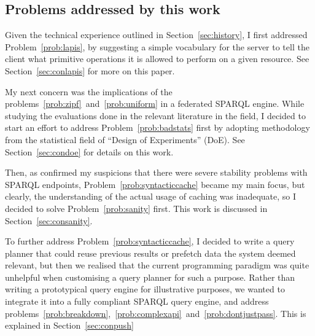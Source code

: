 \subsection{Problems addressed by this work}\label{sec:probaddress}

Given the technical experience outlined in Section~\ref{sec:history},
I first addressed Problem~\ref{prob:lapis}, by suggesting a simple
vocabulary for the server to tell the client what primitive operations
it is allowed to perform on a given resource. See
Section~\ref{sec:conlapis} for more on this paper.

My next concern was the implications of the
problems~\ref{prob:zipf}~and~\ref{prob:uniform} in a federated SPARQL
engine. While studying the evaluations done in the relevant literature
in the field, I decided to start an effort to address
Problem~\ref{prob:badstats} first by adopting methodology from the
statistical field of ``Design of Experiments'' (DoE). See
Section~\ref{sec:condoe} for details on this work.

Then, as \cite{buil2013sparql} confirmed my suspicions that there were
severe stability problems with SPARQL endpoints,
Problem~\ref{prob:syntacticcache} became my main focus, but clearly,
the understanding of the actual usage of caching was inadequate, so I
decided to solve Problem~\ref{prob:sanity} first. This work is
discussed in Section~\ref{sec:consanity}.


To further address Problem~\ref{prob:syntacticcache}, I decided to
write a query planner that could reuse previous results or prefetch
data the system deemed relevant, but then we realised that the current
programming paradigm was quite unhelpful when customising a query
planner for such a purpose. Rather than writing a prototypical query
engine for illustrative purposes, we wanted to integrate it into a
fully compliant SPARQL query engine, and address
problems~\ref{prob:breakdown},~\ref{prob:complexapi}~and~\ref{prob:dontjustpass}. This
is explained in Section~\ref{sec:conpush}


